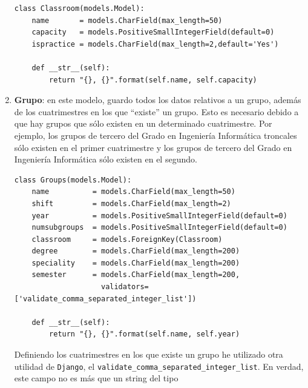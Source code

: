 \begin{enumerate}[---]
\begin{verbatim}
class Classroom(models.Model):
    name       = models.CharField(max_length=50)
    capacity   = models.PositiveSmallIntegerField(default=0)
    ispractice = models.CharField(max_length=2,default='Yes')

    def __str__(self):
        return "{}, {}".format(self.name, self.capacity)
\end{verbatim}

    \item \textbf{Grupo}: en este modelo, guardo todos los datos relativos a un grupo, además de los cuatrimestres en los que ``existe'' un grupo. Esto es necesario debido a que hay grupos que sólo existen en un determinado cuatrimestre. Por ejemplo, los grupos de tercero del Grado en Ingeniería Informática troncales sólo existen en el primer cuatrimestre y los grupos de tercero del Grado en Ingeniería Informática sólo existen en el segundo. 

\begin{verbatim}
class Groups(models.Model):
    name          = models.CharField(max_length=50)
    shift         = models.CharField(max_length=2)
    year          = models.PositiveSmallIntegerField(default=0)
    numsubgroups  = models.PositiveSmallIntegerField(default=0)
    classroom     = models.ForeignKey(Classroom)
    degree        = models.CharField(max_length=200)
    speciality    = models.CharField(max_length=200)
    semester      = models.CharField(max_length=200, 
                    validators=['validate_comma_separated_integer_list'])

    def __str__(self):
        return "{}, {}".format(self.name, self.year)
\end{verbatim}

Definiendo los cuatrimestres en los que existe un grupo he utilizado otra utilidad de \texttt{Django}, el \texttt{validate_comma_separated_integer_list}. En verdad, este campo no es más que un string del tipo 

\end{enumerate}

